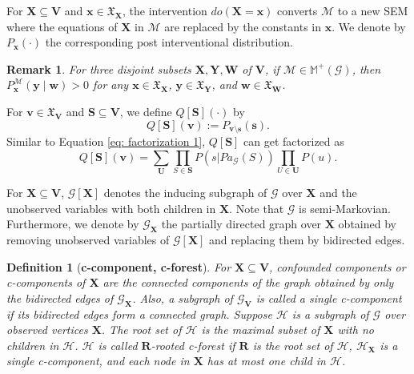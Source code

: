 \documentclass[accepted]{uai2022}
\newtheorem{definition}{Definition}
\newtheorem{remark}{Remark}
\newcommand{\Pa}[2]{\textit{Pa}_{#2}(#1)}
\newcommand{\V}[0]{\mathbf{V}}
\newcommand{\U}[0]{\mathbf{U}}
\newcommand{\X}[0]{\mathbf{X}}
\newcommand{\Y}[0]{\mathbf{Y}}
\newcommand{\x}[0]{\mathbf{x}}
\newcommand{\y}[0]{\mathbf{y}}
\newcommand{\G}[0]{\mathcal{G}}
\newcommand{\M}[0]{\mathcal{M}}
\newcommand{\dom}[1]{\mathfrak{X}_{#1}}
\begin{document}
        For $\X \subseteq \V$ and $\x \in \dom{\X}$, the intervention $do(\X = \x)$ converts $\M$ to a new SEM where the equations of $\X$ in $\M$ are replaced by the constants in $\x$. 
        We denote by $P_{\x}(\cdot)$ the corresponding post interventional distribution.
        \begin{remark}
            For three disjoint subsets $\X, \Y, \mathbf{W}$ of $\V$, if $\M \in \mathbb{M}^+(\G)$, then $P^{\M}_{\x}(\y \mid \mathbf{w})>0$
            for any $\x \in \dom{\X}$, $\y \in \dom{\Y}$, and $\mathbf{w} \in \dom{\mathbf{W}}$.
        \end{remark}
        For $\mathbf{v} \in \dom{\V}$ and $\mathbf{S} \subseteq \V$, we define $Q[\mathbf{S}](\cdot)$ by 
        \begin{equation} \label{eq: Q}
            Q[\mathbf{S}](\mathbf{v}) := P_{\mathbf{v}\setminus \mathbf{s}}(\mathbf{s}).
        \end{equation}
        Similar to Equation \eqref{eq: factorization 1}, $Q[\mathbf{S}]$ can get factorized as 
        \begin{equation} \label{eq: factorization 2}
            Q[\mathbf{S}](\mathbf{v})= \sum_{\U} \prod_{S \in \mathbf{S}}P(s|\Pa{S}{\G}) \prod_{U\in \U}P(u).
        \end{equation}
        
        
        For $\X \subseteq \V$, $\G[\X]$ denotes the inducing subgraph of $\G$ over $\X$ and the unobserved variables with both children in $\X$. 
        Note that $\G$ is semi-Markovian.
        Furthermore, we denote by $\G_{\X}$ the partially directed graph over $\X$ obtained by removing unobserved variables of $\G[\X]$ and replacing them by bidirected edges.
    
        \begin{definition}[\textbf{c-component, c-forest}] \label{def: c-component and c-forest}
            For $\X \subseteq \V$, confounded components or c-components of $\X$ are the connected components of the graph obtained by only the bidirected edges of $\G_{\X}$.
            Also, a subgraph of $\G_\V$ is called a single c-component if its bidirected edges form a connected graph. 
            Suppose $\mathcal{H}$ is a subgraph of $\G$ over observed vertices $\X$. 
            The root set of $\mathcal{H}$ is the maximal subset of $\X$ with no children in $\mathcal{H}$. 
            $\mathcal{H}$ is called $\mathbf{R}$-rooted c-forest if $\mathbf{R}$ is the root set of $\mathcal{H}$, $\mathcal{H}_{\X}$ is a single c-component, and each node in $\X$ has at most one child in $\mathcal{H}$. 
        \end{definition}
        
\end{document}
